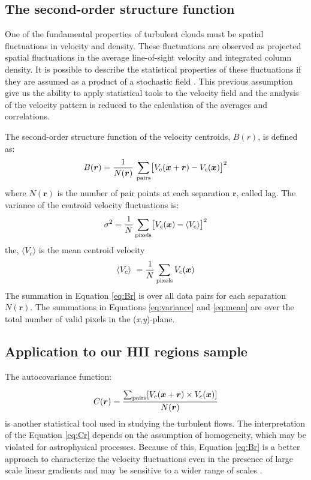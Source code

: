 \documentclass[fleqn,usenatbib, useAMS, a4paper]{mnras}
\begin{document}
\subsection{The second-order structure function}
\label{sec:second-order-struct}
One of the fundamental properties of turbulent clouds must be spatial fluctuations in velocity and density.                                     
These fluctuations are observed as projected spatial fluctuations in the average line-of-sight velocity and integrated column density.
It is possible to describe the statistical properties of these fluctuations if they are assumed as a product of a stochastic field \citep{1984ApJ...277..556S}. 
This previous assumption give us the ability to apply statistical tools to the velocity field and the analysis of the velocity pattern is reduced to the calculation of the averages and correlations.

The second-order structure function of the velocity centroids, $B(r)$, is defined as:
%
\begin{equation}\label{eq:Br}
  B(\boldsymbol{r}) = \dfrac{1}{N(\boldsymbol{r})}
  \,
  \sum_{\text{pairs}} \bigl[
  V_{c}(\boldsymbol{x} + \boldsymbol{r}) - V_{c}(\boldsymbol{x})
  \bigr]^{2}
\end{equation}
%
where $N(\boldsymbol{r})$ is the number of pair points at each separation \(\boldsymbol{r}\), called lag. 
The variance of the centroid velocity fluctuations is:
%
\begin{equation}\label{eq:variance}
\sigma^2  = \frac{1}{N} \sum_{\text{pixels}} \bigl[ V_c (\boldsymbol{x}) -\langle V_ c\rangle  \bigr]^2
\end{equation}
%
the, \(\langle V_c \rangle \) is the mean centroid velocity
%
\begin{equation}\label{eq:mean}
\langle V_c \rangle \  = \frac{1}{N} \sum_{\text{pixels}} V_c (\boldsymbol{x})
\end{equation}
%
The summation in Equation \ref{eq:Br} is over all data pairs for each separation \(N(\boldsymbol{r})\).
The summations in Equations \ref{eq:variance} and \ref{eq:mean} are over the total number of valid pixels in the (\textit{x},\textit{y})-plane.

\subsection{Application to our HII regions sample}\label{sec:apply}

The autocovariance function:

\begin{equation}\label{eq:Cr}
C(\boldsymbol{r}) = \dfrac{\sum_{\text{pairs}}[V_{c}(\boldsymbol{x} + \boldsymbol{r}) \times V_{c}(\boldsymbol{x}) ]} {N(\boldsymbol{r})}
\end{equation}
%
is another statistical tool used in studying the turbulent flows.
The interpretation of the Equation \ref{eq:Cr} depends on the assumption of homogeneity, which may be violated for astrophysical processes.
Because of this, Equation \ref{eq:Br} is a better approach to characterize the velocity fluctuations even in the presence of large scale linear gradients and may be sensitive to a wider range of scales \citep{1984ApJ...277..556S}.
\end{document}
